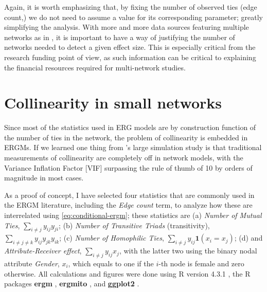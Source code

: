 \documentclass[12pt]{article}
\begin{document}
Again, it is worth emphasizing that, by fixing the number of observed ties (edge count,) we do not need to assume a value for its corresponding parameter; greatly simplifying the analysis. With more and more data sources featuring multiple networks as in \cite{krivitskyTaleTwoDatasets2022}, it is important to have a way of justifying the number of networks needed to detect a given effect size. This is especially critical from the research funding point of view, as such information can be critical to explaining the financial resources required for multi-network studies.

\section{Collinearity in small networks}

Since most of the statistics used in ERG models are by construction function of the number of ties in the network, the problem of collinearity is embedded in ERGMs. If we learned one thing from \cite*{duxburyDiagnosingMulticollinearityExponential2021}'s large simulation study is that traditional measurements of collinearity are completely off in network models, with the Variance Inflation Factor [VIF] surpassing the rule of thumb of 10 by orders of magnitude in most cases.

As a proof of concept, I have selected four statistics that are commonly used in the ERGM literature, including the \textit{Edge count} term, to analyze how these are interrelated using \eqref{eq:conditional-ergm}; these statistics are (a) \textit{Number of Mutual Ties}, $\sum_{i\neq j}y_{ij}y_{ji}$; (b) \textit{Number of Transitive Triads} (transitivity), $\sum_{i\neq j\neq k}y_{ij}y_{jk}y_{ik}$; (c) \textit{Number of Homophilic Ties}, $\sum_{i\neq j}y_{ij}\mathbf{1}\left(x_i=x_j\right)$; (d) and \textit{Attribute-Receiver effect}, $\sum_{i\neq j}y_{ij}x_j$, with the latter two using the binary nodal attribute \textit{Gender}, $x_i$, which equals to one if the $i$-th node is female and zero otherwise. All calculations and figures were done using R version 4.3.1 \citep{R}, the R packages \textbf{ergm} \citep{hunterErgmPackageFit2008,handcockErgmFitSimulate2023,krivitskyErgm4NewFeatures2023}, \textbf{ergmito} \citep{ergmito,yonExponentialRandomGraph2021}, and \textbf{ggplot2} \citep{ggplot2}.

\bigskip
\end{document}
